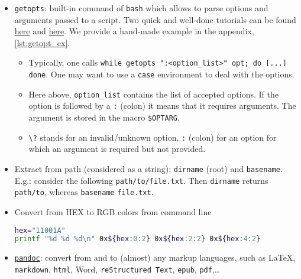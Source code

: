 \documentclass[a4paper,12pt,%
              final%
              ]{article}
\begin{document}
\begin{itemize}
    \begin{itemize}
      \item Files must be \textbf{sorted}
      \item Variable \texttt{n} is a combination of \texttt{1}, \texttt{2}, and \texttt{3}. \texttt{1} / \texttt{2} means suppress lines unique to \verb|file_1/2|, \texttt{3} means suppress shared lines
      \item Keep lines from \verb|file_1| only \verb|comm -23 <(sort file_1) <(sort file_2)|
      \item Keep lines from \verb|file_2| only \verb|comm -13 <(sort file_1) <(sort file_2)|
    \end{itemize}
  \item \texttt{getopts}: built-in command of \texttt{bash} which allows to parse options and arguments passed to a script. Two quick and well-done tutorials can be found \href{https://www.computerhope.com/unix/bash/getopts.htm}{here} and \href{https://sookocheff.com/post/bash/parsing-bash-script-arguments-with-shopts/}{here}. We provide a hand-made example in the appendix, \autoref{lst:getopt_ex}.
    \begin{itemize}
      \item Typically, one calls \verb|while getopts ":<option_list>" opt; do [...] done|. One may want to use a \verb|case| environment to deal with the options.
      \item Here above, \verb|option_list| contains the list of accepted options. If the option is followed by a \verb|:| (colon) it means that it requires arguments. The argument is stored in the macro \verb|$OPTARG|.
      \item \verb|\?| stands for an invalid/unknown option, \verb|:| (colon) for an option for which an argument is required but not provided.
    \end{itemize}
  \item Extract from path (considered as a string): \texttt{dirname} (root) and \texttt{basename}. E.g.: consider the following \texttt{path/to/file.txt}. Then \texttt{dirname} returns \texttt{path/to}, whereas \texttt{basename} \texttt{file.txt}.
  \item Convert from HEX to RGB colors from command line
\begin{lstlisting}[language=bash]
hex="11001A"
printf "%d %d %d\n" 0x${hex:0:2} 0x${hex:2:2} 0x${hex:4:2}
\end{lstlisting}
  \item \href{https://pandoc.org/}{\texttt{pandoc}}: convert from and to (almost) any markup languages, such as \LaTeX{}, \texttt{markdown}, \texttt{html}, Word, \texttt{reStructured Text}, \texttt{epub}, \texttt{pdf},\ldots
\end{itemize}
\end{document}
